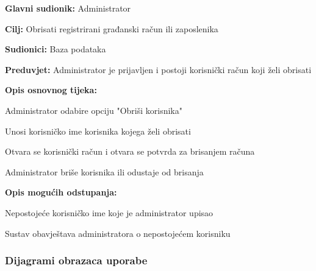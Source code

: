 				\noindent {}
				\begin{packed_item}
					
					\item \textbf{Glavni sudionik: }Administrator
					\item  \textbf{Cilj:} Obrisati registrirani građanski račun ili zaposlenika
					\item  \textbf{Sudionici:} Baza podataka
					\item  \textbf{Preduvjet:} Administrator je prijavljen i postoji korisnički račun koji želi obrisati
					\item  \textbf{Opis osnovnog tijeka:}
					
					\item[] \begin{packed_enum}
						
						\item Administrator odabire opciju "Obriši korisnika"
						\item Unosi korisničko ime korisnika kojega želi obrisati
						\item Otvara se korisnički račun i otvara se potvrda za brisanjem računa
						\item Administrator briše korisnika ili odustaje od brisanja
					\end{packed_enum}
					
					\item  \textbf{Opis mogućih odstupanja:}
					
					\item[] \begin{packed_item}
						
						\item[2.a] Nepostojeće korisničko ime koje je administrator upisao
						\item[] \begin{packed_enum}
							
							\item Sustav obavještava administratora o nepostojećem korisniku
							
						\end{packed_enum}
						
						
					\end{packed_item}
				\end{packed_item}	
				\eject
				

				\subsubsection{Dijagrami obrazaca uporabe}
				
